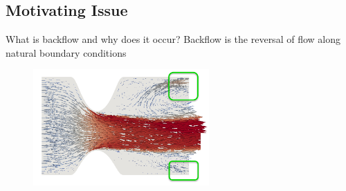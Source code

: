 \subsection{Motivating Issue}
\begin{frame}{What is backflow and why does it occur?}
    Backflow is the reversal of flow along natural boundary conditions
       \begin{figure}[b]
      \centering
      \includegraphics[width=0.6\textwidth]{Media/backflowareas.png}
  \end{figure}
\end{frame}
